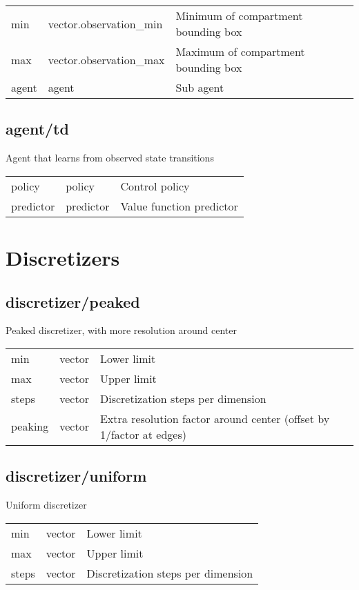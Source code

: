 \noindent\begin{tabular}{@{}lll@{}}
min&vector.observation\_min&Minimum of compartment bounding box\\
max&vector.observation\_max&Maximum of compartment bounding box\\
agent&agent&Sub agent\\
\end{tabular}
\subsection{agent/td}
\noindent Agent that learns from observed state transitions\\

\noindent\begin{tabular}{@{}lll@{}}
policy&policy&Control policy\\
predictor&predictor&Value function predictor\\
\end{tabular}
\section{Discretizers}
\subsection{discretizer/peaked}
\noindent Peaked discretizer, with more resolution around center\\

\noindent\begin{tabular}{@{}lll@{}}
min&vector&Lower limit\\
max&vector&Upper limit\\
steps&vector&Discretization steps per dimension\\
peaking&vector&Extra resolution factor around center (offset by 1/factor at edges)\\
\end{tabular}
\subsection{discretizer/uniform}
\noindent Uniform discretizer\\

\noindent\begin{tabular}{@{}lll@{}}
min&vector&Lower limit\\
max&vector&Upper limit\\
steps&vector&Discretization steps per dimension\\
\end{tabular}
